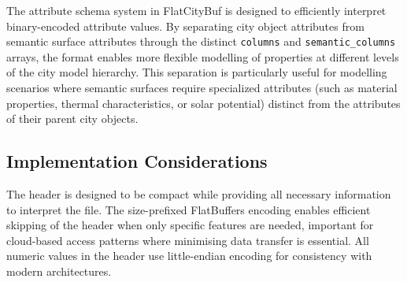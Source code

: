 The attribute schema system in FlatCityBuf is designed to efficiently interpret binary-encoded attribute values. By separating city object attributes from semantic surface attributes through the distinct \texttt{columns} and \texttt{semantic\_columns} arrays, the format enables more flexible modelling of properties at different levels of the city model hierarchy. This separation is particularly useful for modelling scenarios where semantic surfaces require specialized attributes (such as material properties, thermal characteristics, or solar potential) distinct from the attributes of their parent city objects.

\subsection{Implementation Considerations}
\label{methodology:header:implementation_considerations}

The header is designed to be compact while providing all necessary information to interpret the file. The size-prefixed FlatBuffers encoding enables efficient skipping of the header when only specific features are needed, important for cloud-based access patterns where minimising data transfer is essential. All numeric values in the header use little-endian encoding for consistency with modern architectures.
